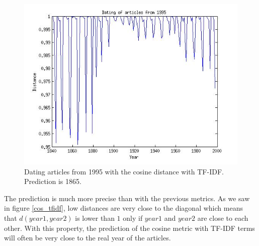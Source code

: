 \begin{figure}[H]
\begin{minipage}[b]{0.3\linewidth}
    \end{minipage}\hfill
    \begin{minipage}[b]{0.3\linewidth}
	\includegraphics[scale=0.25]{Pictures/date_articles/cos/dating1995_tfidf.jpg}
        \caption{Dating articles from 1995 with the cosine distance with TF-IDF. Prediction is 1865.}
        \label{date_cos_tfidf1}
    \end{minipage}
\end{figure}

The prediction is much more precise than with the previous metrics. As we saw in figure \ref{cos_tfidf}, low distances are very close to the diagonal which means that $d(year1, year2)$ is lower than $1$ only if $year1$ and $year2$ are close to each other. With this property, the prediction of the cosine metric with TF-IDF terms will often be very close to the real year of the articles.